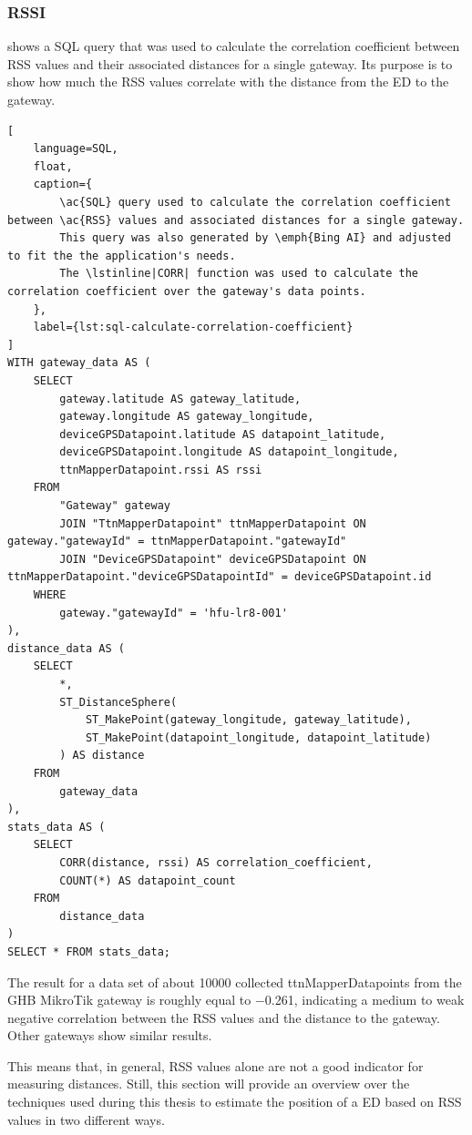 \subsubsection{\acl{RSSI}}

 shows a \ac{SQL} query that was used to calculate the correlation coefficient between \ac{RSS} values and their associated distances for a single gateway.
Its purpose is to show how much the \ac{RSS} values correlate with the distance from the \acl{ED} to the gateway.

\begin{lstlisting}[
    language=SQL,
    float,
    caption={
        \ac{SQL} query used to calculate the correlation coefficient between \ac{RSS} values and associated distances for a single gateway.
        This query was also generated by \emph{Bing AI} and adjusted to fit the the application's needs.
        The \lstinline|CORR| function was used to calculate the correlation coefficient over the gateway's data points.
    },
    label={lst:sql-calculate-correlation-coefficient}
]
WITH gateway_data AS (
    SELECT
        gateway.latitude AS gateway_latitude,
        gateway.longitude AS gateway_longitude,
        deviceGPSDatapoint.latitude AS datapoint_latitude,
        deviceGPSDatapoint.longitude AS datapoint_longitude,
        ttnMapperDatapoint.rssi AS rssi
    FROM
        "Gateway" gateway
        JOIN "TtnMapperDatapoint" ttnMapperDatapoint ON gateway."gatewayId" = ttnMapperDatapoint."gatewayId"
        JOIN "DeviceGPSDatapoint" deviceGPSDatapoint ON ttnMapperDatapoint."deviceGPSDatapointId" = deviceGPSDatapoint.id
    WHERE
        gateway."gatewayId" = 'hfu-lr8-001'
),
distance_data AS (
    SELECT
        *,
        ST_DistanceSphere(
            ST_MakePoint(gateway_longitude, gateway_latitude),
            ST_MakePoint(datapoint_longitude, datapoint_latitude)
        ) AS distance
    FROM
        gateway_data
),
stats_data AS (
    SELECT
        CORR(distance, rssi) AS correlation_coefficient,
		COUNT(*) AS datapoint_count
    FROM
        distance_data
)
SELECT * FROM stats_data;
\end{lstlisting}

The result for a data set of about \num{10000} collected ttnMapperDatapoints from the \ac{GHB} MikroTik gateway is roughly equal to \num{-0.261}, indicating a medium to weak negative correlation between the \ac{RSS} values and the distance to the gateway.
Other gateways show similar results.

This means that, in general, \ac{RSS} values alone are not a good indicator for measuring distances.
Still, this section will provide an overview over the techniques used during this thesis to estimate the position of a \acl{ED} based on \ac{RSS} values in two different ways.

